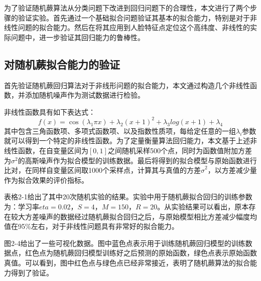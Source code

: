 为了验证随机蕨算法从分类问题下改进到回归问题下的合理性，本文进行了两个步骤的验证实验。首先通过一个基础拟合问题验证其基本的拟合能力，特别是对于非线性问题的拟合能力。然后在将其应用到人脸特征点定位这个高纬度、非线性的实际问题中，进一步验证其回归能力的鲁棒性。

\subsection{对随机蕨拟合能力的验证} %

首先验证随机蕨回归算法对于非线形问题的拟合能力，本文通过构造几个非线性函数，并添加随机噪声作为测试数据进行检验。

非线性函数具有如下表达式：
\begin{equation}
	f(x) = \cos(\lambda_1\pi x)+ \lambda_2 (x+1)^2 + \lambda_3 log(x+1) + \lambda_4
\end{equation}
其中包含三角函数项、多项式函数项、以及指数性质项，每给定任意的一组$\lambda_i$参数就可以得到一个特定的非线性函数。为了定量衡量算法回归能力，本文基于上述非线性函数，在自变量区间为$[0,1]$之间随机采样500个点，同时为函数值附加方差为$\sigma^2$的高斯噪声作为拟合模型的训练数据。最后将得到的拟合模型与原始函数进行比对，在同样自变量区间取1000个采样点，计算其与真值的方差$\hat{\sigma}^2$，以方差减少量作为拟合效果的评价指标。

表格2-1给出了其中20次随机实验的结果。实验中用于随机蕨拟合回归的训练参数为：学习率$eta=0.02$，$S=4$，$M=150$，$R=20$。从实验结果可以看出，原本存在较大方差噪声的数据经过随机蕨拟合回归之后，与原始模型相比方差减少幅度均值在95\%左右，对于非线性问题具有非常好的拟合能力。

图2-4给出了一些可视化数据。图中蓝色点表示用于训练随机蕨回归模型的训练数据点，红色点为随机蕨回归模型训练好之后预测的原始函数，绿色点表示原始函数真值。可以看到，图中红色点与绿色点已经非常接近，表明了随机蕨算法的拟合能力得到了验证。

